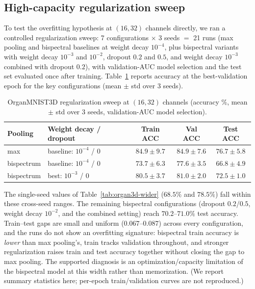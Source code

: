 \documentclass{article}
\theoremstyle{definition}
\theoremstyle{remark}
\theoremstyle{definition}
\begin{document}
\subsection{High-capacity regularization sweep}
\label{app:organ3d-sweep}

To test the overfitting hypothesis at $(16, 32)$ channels directly, we
ran a controlled regularization sweep: 7 configurations $\times$ 3
seeds $=$ 21 runs (max pooling and bispectral baselines at weight
decay $10^{-4}$, plus bispectral variants with weight decay $10^{-3}$
and $10^{-2}$, dropout $0.2$ and $0.5$, and weight decay $10^{-3}$
combined with dropout $0.2$), with validation-AUC model selection and
the test set evaluated once after training.
Table~\ref{tab:organ3d-regsweep} reports accuracy at the
best-validation epoch for the key configurations
(mean $\pm$ std over 3 seeds).

\begin{table}[h]
  \caption{OrganMNIST3D regularization sweep at $(16, 32)$ channels
    (accuracy \%, mean $\pm$ std over 3 seeds, validation-AUC model
    selection).}
  \label{tab:organ3d-regsweep}
  \centering
  \small
  \begin{tabular}{llccc}
    \toprule
    Pooling & Weight decay / dropout & Train ACC & Val ACC & Test ACC \\
    \midrule
    max        & baseline: $10^{-4}$ / 0 & $84.9 \pm 9.7$ & $84.9 \pm 7.6$ & $76.7 \pm 5.8$ \\
    bispectrum & baseline: $10^{-4}$ / 0 & $73.7 \pm 6.3$ & $77.6 \pm 3.5$ & $66.8 \pm 4.9$ \\
    bispectrum & best: $10^{-3}$ / 0     & $80.5 \pm 3.7$ & $81.0 \pm 2.0$ & $72.5 \pm 1.0$ \\
    \bottomrule
  \end{tabular}
\end{table}

The single-seed values of Table~\ref{tab:organ3d-wider} ($68.5\%$ and
$78.5\%$) fall within these cross-seed ranges. The remaining
bispectral configurations (dropout $0.2$/$0.5$, weight decay
$10^{-2}$, and the combined setting) reach $70.2$--$71.0\%$ test
accuracy. Train--test gaps are small and uniform ($0.067$--$0.087$)
across every configuration, and the runs do not show an overfitting
signature: bispectral train accuracy is \emph{lower} than max
pooling's, train tracks validation throughout, and stronger
regularization raises train and test accuracy together without
closing the gap to max pooling. The supported diagnosis is an
optimization/capacity limitation of the bispectral model at this
width rather than memorization. (We report summary statistics here;
per-epoch train/validation curves are not reproduced.)
\end{document}

